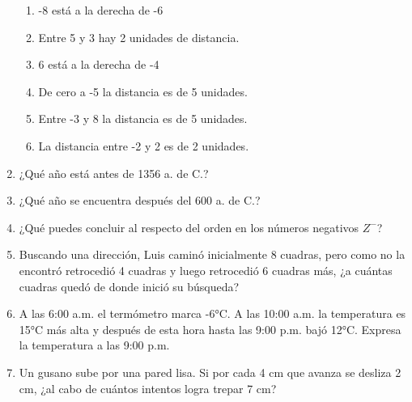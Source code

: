 \documentclass[fleqn]{article}
\begin{document}
\begin{enumerate}
\begin{enumerate}
  \item -8 está a la derecha de -6 \noanswer
  \item Entre 5 y 3 hay 2 unidades de distancia.\noanswer
  \item 6 está a la derecha de -4 \noanswer
  \newpage
  \item De cero a -5 la distancia es de 5 unidades.\noanswer[.25in]
  \item Entre -3 y 8 la distancia es de 5 unidades.\noanswer[.25in]
    \item La distancia entre -2 y 2 es de 2 unidades. \noanswer[.25in]
\end{enumerate}
  \item ¿Qué año está antes de 1356 a. de C.?\dotfill
    \item ¿Qué año se encuentra después del 600 a. de C.? \dotfill
  \item ¿Qué puedes concluir al respecto del orden en los números negativos $Z^-$?\noanswer
\item Buscando una dirección, Luis caminó inicialmente 8 cuadras, pero como no la encontró retrocedió 4 cuadras y luego retrocedió 6 cuadras más, ¿a cuántas cuadras quedó de donde inició su búsqueda?\noanswer
\item A las 6:00 a.m. el termómetro marca -6°C. A las 10:00 a.m. la temperatura es 15°C más alta y después de esta hora hasta las 9:00 p.m. bajó 12°C. Expresa la temperatura a las 9:00 p.m. \noanswer
\item Un gusano sube por una pared lisa. Si por cada 4 cm que avanza se desliza 2 cm, ¿al cabo de cuántos intentos logra trepar 7 cm? \noanswer
\end{enumerate}
\end{document}
